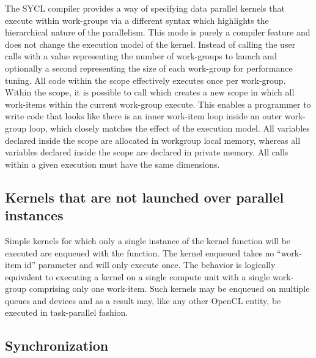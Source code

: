 The SYCL compiler provides a way of specifying data parallel kernels
that execute within work-groups via a different syntax which
highlights the hierarchical nature of the parallelism. This mode is
purely a compiler feature and does not change the execution model of
the kernel. Instead of calling  the
user calls  with a
 value representing the number of
work-groups to launch and optionally a second
 representing the size of each work-group
for performance tuning. All code within the
 scope effectively executes once
per work-group. Within the  scope,
it is possible to call  which
creates a new scope in which all work-items within the current
work-group execute. This enables a programmer to write code that looks
like there is an inner work-item loop inside an outer work-group loop,
which closely matches the effect of the execution model. All variables
declared inside the  scope are
allocated in workgroup local memory, whereas all variables declared
inside the  scope are declared in
private memory. All  calls within a
given  execution must have the
same dimensions.


\subsection{Kernels that are not launched over parallel instances}

Simple kernels for which only a single instance of the kernel function will be
executed are enqueued with the  function. The
kernel enqueued takes no ``work-item id'' parameter and will only execute once.
The behavior is logically equivalent to executing a kernel on a single compute
unit with a single work-group comprising only one work-item. Such kernels may be
enqueued on multiple queues and devices and as a result may, like any other
OpenCL entity, be executed in task-parallel fashion.

\subsection{Synchronization}
\label{sec:synchronization}

